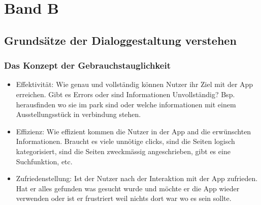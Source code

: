 \documentclass[10pt]{article}
\begin{document}
	\section{Band B}
	\subsection{Grundsätze der Dialoggestaltung verstehen}
	\subsubsection[Konzept der Gebrauchs Tauglichkeit]{Das Konzept der Gebrauchstauglichkeit}
	\begin{itemize}
		\item Effektivität: Wie genau und vollständig können Nutzer ihr Ziel mit der App erreichen. Gibt es Errors oder sind Informationen Unvollständig? Bsp. herausfinden wo sie im park sind oder welche informationen mit einem Ausstellungsstück in verbindung stehen.
		
		\item Effizienz: Wie effizient kommen die Nutzer in der App and die erwünschten Informationen. Braucht es viele unnötige clicks, sind die Seiten logisch kategorisiert, sind die Seiten zweckmässig angeschrieben, gibt es eine Suchfunktion, etc.
				 
		\item Zufriedenstellung: Ist der Nutzer nach der Interaktion mit der App zufrieden. Hat er alles gefunden was gesucht wurde und möchte er die App wieder verwenden oder ist er frustriert weil nichts dort war wo es sein sollte.
	\end{itemize}
\end{document}
